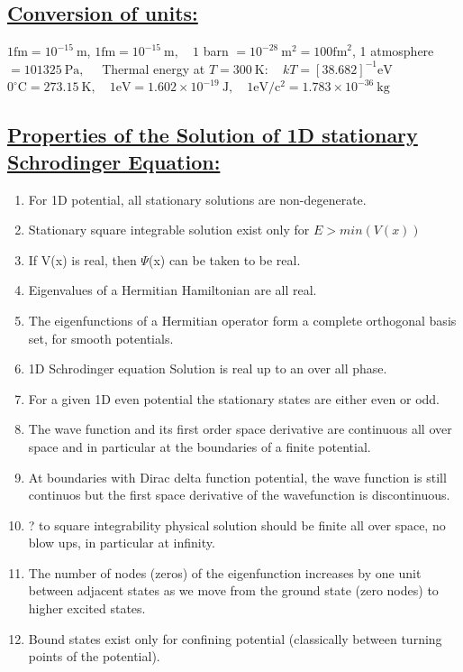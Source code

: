 \documentclass[a4paper,12pt]{article}
\begin{document}
\subsection*{\underline{Conversion of units:}}
$1 \mathrm{fm}=10^{-15} \mathrm{~m}$, $1 \mathrm{fm}=10^{-15} \mathrm{~m}, \quad 1$ barn $=10^{-28} \mathrm{~m}^{2}=100 \mathrm{fm}^{2}$, 1 atmosphere $=101325 \mathrm{~Pa}, \quad$ Thermal energy at $T=300 \mathrm{~K}: \quad k T=[38.682]^{-1} \mathrm{eV}$ $0^{\circ} \mathrm{C}=273.15 \mathrm{~K}, \quad 1 \mathrm{eV}=1.602 \times 10^{-19} \mathrm{~J}, \quad 1 \mathrm{eV} / \mathrm{c}^{2}=1.783 \times 10^{-36} \mathrm{~kg}$

\subsection*{\underline{Properties of the Solution of 1D stationary Schrodinger Equation:}}
\begin{enumerate}
    \item For 1D potential, all stationary solutions are non-degenerate.
    \item Stationary square integrable solution exist only for $E > min{(V(x))}$
    \item If V(x) is real, then $\Psi$(x) can be taken to be real.
    \item Eigenvalues of a Hermitian Hamiltonian are all real.
    \item The eigenfunctions of a Hermitian operator form a complete orthogonal basis set, for smooth potentials.
    \item 1D Schrodinger equation Solution is real up to an over all phase.
    \item For a given 1D even potential the stationary states are either even or odd.
    \item The wave function and its first order space derivative are continuous all over space and in particular at the boundaries of a finite potential.
    \item At boundaries with Dirac delta function potential,
          the wave function is still continuos but the first space derivative of the wavefunction is discontinuous. 
    \item ? to square integrability physical solution should be finite all over space, no blow ups, in particular at infinity.
    \item The number of nodes (zeros) of the eigenfunction increases by one unit between adjacent states as we move from the ground state (zero nodes) to higher excited states.
    \item Bound states exist only for confining potential (classically between turning points of the potential).
\end{enumerate}
\end{document}
